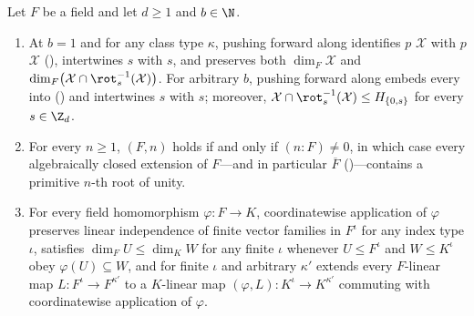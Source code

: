 \begin{proposition}\label{prop:linear-model-bridges}
Let $F$ be a field and let $d \ge 1$ and $b \in \N$.
\begin{enumerate}[label=(\alph*)]
\item At $b = 1$ and for any class type $\kappa$, pushing forward along 
  identifies  $p$ $\mathcal{X}$ with
   $p$ $\mathcal{X}$
  (\cite[Definition~6.3]{SeventeenthPaper2026}), intertwines  $s$ with
   $s$, and preserves both $\dim_F \mathcal{X}$ and
  $\dim_F\bigl(\mathcal{X} \cap \rot_s^{-1}(\mathcal{X})\bigr)$. For arbitrary $b$, pushing forward
  along  embeds every  into
   (\cite[Definition~2.1]{SharedDecoders2026}) and intertwines
   $s$ with  $s$; moreover,
  $\mathcal{X} \cap \rot_s^{-1}(\mathcal{X}) \le H_{\{0, s\}}$ for every $s \in \Z_d$.
\item For every $n \ge 1$, $(F, n)$ holds if and only if $(n : F) \ne 0$, in
  which case every algebraically closed extension of $F$---and in particular $\overline{F}$
  ()---contains a primitive $n$-th root of unity.
\item For every field homomorphism $\varphi : F \to K$, coordinatewise application of $\varphi$
  preserves linear independence of finite vector families in $F^\iota$ for any index type $\iota$,
  satisfies $\dim_F U \le \dim_K W$ for any finite $\iota$ whenever $U \le F^\iota$ and
  $W \le K^\iota$ obey $\varphi(U) \subseteq W$, and for finite $\iota$ and arbitrary $\kappa'$ extends
  every $F$-linear map $L : F^\iota \to F^{\kappa'}$ to a $K$-linear map
  $(\varphi, L) : K^\iota \to K^{\kappa'}$ commuting with coordinatewise
  application of $\varphi$.
\end{enumerate}
\end{proposition}
